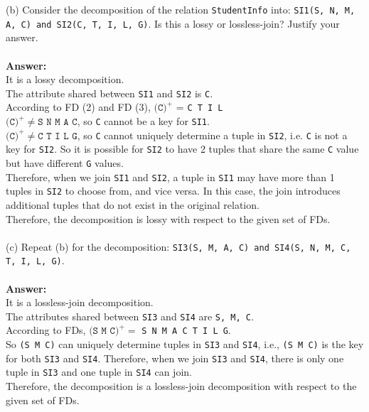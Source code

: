 \documentclass{article}
\begin{document}
\noindent (b) Consider the decomposition of the relation \texttt{StudentInfo} into: \texttt{SI1(S, N, M, A, C) and SI2(C, T, I, L, G)}. Is this a lossy or lossless-join? Justify your answer.\\
\\
\textbf{Answer:}\\
It is a lossy decomposition.\\
The attribute shared between \texttt{SI1} and \texttt{SI2} is \texttt{C}. \\
According to FD (2) and FD (3), \(\texttt{(C)}^{+}\) = \texttt{C T I L} \\
\(\texttt{(C)}^{+} \neq \texttt{S N M A C} \), so \texttt{C} cannot be a key for \texttt{SI1}. \\
\(\texttt{(C)}^{+} \neq \texttt{C T I L G} \), so \texttt{C} cannot uniquely determine a tuple in \texttt{SI2}, i.e. \texttt{C} is not a key for \texttt{SI2}. So it is possible for \texttt{SI2} to have 2 tuples that share the same \texttt{C} value but have different \texttt{G} values.\\
Therefore, when we join \texttt{SI1} and \texttt{SI2}, a tuple in \texttt{SI1} may have more than 1 tuples in \texttt{SI2} to choose from, and vice versa. In this case, the join introduces additional tuples that do not exist in the original relation.\\
Therefore, the decomposition is lossy with respect to the given set of FDs.\\
\\
\noindent (c) Repeat (b) for the decomposition: \texttt{SI3(S, M, A, C) and SI4(S, N, M, C, T, I, L, G)}. \\
\\
\textbf{Answer:}\\
It is a lossless-join decomposition.\\
The attributes shared between \texttt{SI3} and \texttt{SI4} are \texttt{S, M, C}.\\
According to FDs, \( \texttt{(S M C)}^+ = \) \texttt{S N M A C T I L G}. \\
So \texttt{(S M C)} can uniquely determine tuples in \texttt{SI3} and \texttt{SI4}, i.e., \texttt{(S M C)} is the key for both \texttt{SI3} and \texttt{SI4}. Therefore, when we join \texttt{SI3} and \texttt{SI4}, there is only one tuple in \texttt{SI3} and one tuple in \texttt{SI4} can join. \\
Therefore, the decomposition is a lossless-join decomposition with respect to the given set of FDs.
\end{document}
